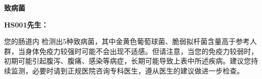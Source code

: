 

\usepackage{graphicx}
\graphicspath{{cores/}}



\setlength{\arrayrulewidth}{0.5pt}
\fontsize{9.3pt}{17pt}\selectfont
\color{gray2}

\vspace*{0mm}
\begin{center}
{\bf\sanhao 致病菌}
\end{center}

\medskip

\noindent
{\bf\xiaosihao HS001先生：}


\bigskip


您的肠道内
检测出5种致病菌，其中金黄色葡萄球菌、脆弱拟杆菌含量高于参考人群，当身体免疫力较强时可能不会出现不适感。但请注意，当您的免疫力较弱时，初期可能引起腹泻、腹痛、感染等病症，长期可能导致上表中所述疾病。建议您持续监测，必要时请到正规医院咨询专科医生，遵从医生的建议做进一步检查。

